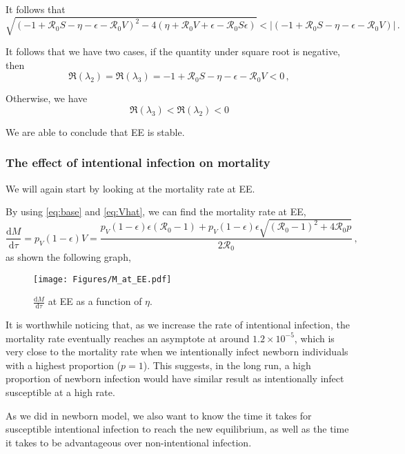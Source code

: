 \documentclass[12pt]{article}
\newcommand\dbyd[2]{\frac{\mathrm d{#1}}{\mathrm d{#2}}}
\newcommand{\R}{\mathcal{R}}
\newcommand{\pmV}{p_{V}}
\begin{document}
It follows that
\begin{equation}
\sqrt{(-1+\R_0 S-\eta-\epsilon-\R_0 V)^2-4(\eta+\R_0 V+\epsilon-\R_0 S\epsilon)}<|(-1+\R_0 S-\eta-\epsilon-\R_0 V)|\,.
\end{equation}

It follows that we have two cases, if the quantity under square root is negative, then
\begin{equation}
\Re(\lambda_2)=\Re(\lambda_3)=-1+\R_0 S-\eta-\epsilon-\R_0 V<0\,,
\end{equation}

Otherwise, we have
\begin{equation}
\Re(\lambda_3)<\Re(\lambda_2)<0
\end{equation}

We are able to conclude that EE is stable.

\subsubsection{The effect of intentional infection on mortality}
We will again start by looking at the mortality rate at EE.

By using \autoref{eq:base} and \autoref{eq:Vhat}, we can find the mortality rate at EE,
\begin{equation}
\dbyd{M}{\tau}=\pmV(1-\epsilon)V=\frac{\pmV(1-\epsilon)\epsilon(\R_0 -1)+ \pmV(1-\epsilon)\epsilon \sqrt{(\R_0-1)^2+4\R_0 p}}{2\R_0}\,, \label{eq:dMdt}
\end{equation}
as shown the following graph,
\begin{figure}[H]
  \centering
  \texttt{[image: Figures/M\_at\_EE.pdf]}
  \caption{$\dbyd{M}{\tau}$ at EE as a function of $\eta$.}
\end{figure}

It is worthwhile noticing that, as we increase the rate of intentional infection, the mortality rate eventually reaches an asymptote at around $1.2\times10^{-5}$, which is very close to the mortality rate when we intentionally infect newborn individuals with a highest proportion ($p=1$). This suggests, in the long run, a high proportion of newborn infection would have similar result as intentionally infect susceptible at a high rate.

As we did in newborn model, we also want to know the time it takes for susceptible intentional infection to reach the new equilibrium, as well as the time it takes to be advantageous over non-intentional infection.
\end{document}
